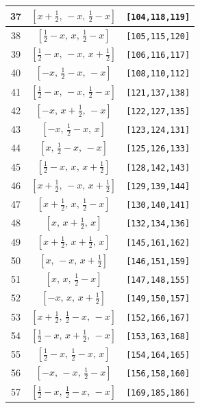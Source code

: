 \documentclass[fleqn,8pt]{jsarticle}
\begin{document}
\begin{longtable}{ccc}
37 & $\left[ x + \frac{1}{2},\, - x,\, \frac{1}{2} - x \right]$ & {\tt [104,118,119]} \\ \hline
38 & $\left[ \frac{1}{2} - x,\, x,\, \frac{1}{2} - x \right]$ & {\tt [105,115,120]} \\ \hline
39 & $\left[ \frac{1}{2} - x,\, - x,\, x + \frac{1}{2} \right]$ & {\tt [106,116,117]} \\ \hline
40 & $\left[ - x,\, \frac{1}{2} - x,\, - x \right]$ & {\tt [108,110,112]} \\ \hline
41 & $\left[ \frac{1}{2} - x,\, - x,\, \frac{1}{2} - x \right]$ & {\tt [121,137,138]} \\ \hline
42 & $\left[ - x,\, x + \frac{1}{2},\, - x \right]$ & {\tt [122,127,135]} \\ \hline
43 & $\left[ - x,\, \frac{1}{2} - x,\, x \right]$ & {\tt [123,124,131]} \\ \hline
44 & $\left[ x,\, \frac{1}{2} - x,\, - x \right]$ & {\tt [125,126,133]} \\ \hline
45 & $\left[ \frac{1}{2} - x,\, x,\, x + \frac{1}{2} \right]$ & {\tt [128,142,143]} \\ \hline
46 & $\left[ x + \frac{1}{2},\, - x,\, x + \frac{1}{2} \right]$ & {\tt [129,139,144]} \\ \hline
47 & $\left[ x + \frac{1}{2},\, x,\, \frac{1}{2} - x \right]$ & {\tt [130,140,141]} \\ \hline
48 & $\left[ x,\, x + \frac{1}{2},\, x \right]$ & {\tt [132,134,136]} \\ \hline
49 & $\left[ x + \frac{1}{2},\, x + \frac{1}{2},\, x \right]$ & {\tt [145,161,162]} \\ \hline
50 & $\left[ x,\, - x,\, x + \frac{1}{2} \right]$ & {\tt [146,151,159]} \\ \hline
51 & $\left[ x,\, x,\, \frac{1}{2} - x \right]$ & {\tt [147,148,155]} \\ \hline
52 & $\left[ - x,\, x,\, x + \frac{1}{2} \right]$ & {\tt [149,150,157]} \\ \hline
53 & $\left[ x + \frac{1}{2},\, \frac{1}{2} - x,\, - x \right]$ & {\tt [152,166,167]} \\ \hline
54 & $\left[ \frac{1}{2} - x,\, x + \frac{1}{2},\, - x \right]$ & {\tt [153,163,168]} \\ \hline
55 & $\left[ \frac{1}{2} - x,\, \frac{1}{2} - x,\, x \right]$ & {\tt [154,164,165]} \\ \hline
56 & $\left[ - x,\, - x,\, \frac{1}{2} - x \right]$ & {\tt [156,158,160]} \\ \hline
57 & $\left[ \frac{1}{2} - x,\, \frac{1}{2} - x,\, - x \right]$ & {\tt [169,185,186]} \\ \hline

\end{longtable}
\end{document}

